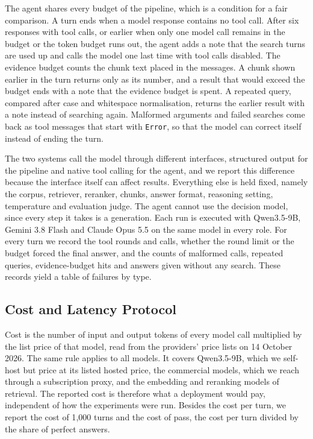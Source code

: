 The agent shares every budget of the pipeline, which is a condition for a fair comparison. A turn ends when a model response contains no tool call. After six responses with tool calls, or earlier when only one model call remains in the budget or the token budget runs out, the agent adds a note that the search turns are used up and calls the model one last time with tool calls disabled. The evidence budget counts the chunk text placed in the messages. A chunk shown earlier in the turn returns only as its number, and a result that would exceed the budget ends with a note that the evidence budget is spent. A repeated query, compared after case and whitespace normalisation, returns the earlier result with a note instead of searching again. Malformed arguments and failed searches come back as tool messages that start with \texttt{Error}, so that the model can correct itself instead of ending the turn.

The two systems call the model through different interfaces, structured output for the pipeline and native tool calling for the agent, and we report this difference because the interface itself can affect results. %
Everything else is held fixed, namely the corpus, retriever, reranker, chunks, answer format, reasoning setting, temperature and evaluation judge. The agent cannot use the decision model, since every step it takes is a generation. Each run is executed with Qwen3.5-9B, Gemini 3.8 Flash and Claude Opus 5.5 on the same model in every role. For every turn we record the tool rounds and calls, whether the round limit or the budget forced the final answer, and the counts of malformed calls, repeated queries, evidence-budget hits and answers given without any search. These records yield a table of failures by type. %

\subsection{Cost and Latency Protocol}\label{sec:cost}

Cost is the number of input and output tokens of every model call multiplied by the list price of that model, read from the providers' price lists on 14 October 2026. The same rule applies to all models. It covers Qwen3.5-9B, which we self-host but price at its listed hosted price, the commercial models, which we reach through a subscription proxy, and the embedding and reranking models of retrieval. The reported cost is therefore what a deployment would pay, independent of how the experiments were run. Besides the cost per turn, we report the cost of 1{,}000 turns and the cost of pass, the cost per turn divided by the share of perfect answers. %

